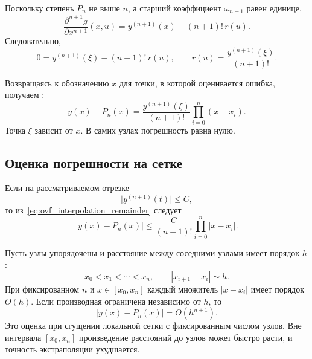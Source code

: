 \documentclass[../final.tex]{subfiles}
\begin{document}
Поскольку степень $P_n$ не выше $n$, а старший коэффициент
$\omega_{n+1}$ равен единице,
%
\begin{equation*}
    \frac{\partial^{n+1}g}{\partial x^{n+1}}(x,u)
    =y^{(n+1)}(x)-(n+1)!\,r(u).
\end{equation*}
%
Следовательно,
%
\begin{equation*}
    0=y^{(n+1)}(\xi)-(n+1)!\,r(u),
    \qquad
    r(u)=\frac{y^{(n+1)}(\xi)}{(n+1)!}.
\end{equation*}

Возвращаясь к обозначению $x$ для точки, в которой оценивается ошибка,
получаем :
%
\begin{equation}
    y(x)-P_n(x)=\frac{y^{(n+1)}(\xi)}{(n+1)!}
    \prod_{i=0}^{n}(x-x_i).
    \label{eq:ovf_interpolation_remainder}
\end{equation}
%
Точка $\xi$ зависит от $x$. В самих узлах погрешность равна нулю.

\subsection{Оценка погрешности на сетке}

Если на рассматриваемом отрезке
%
\begin{equation*}
    \bigl|y^{(n+1)}(t)\bigr|\le C,
\end{equation*}
%
то из~\eqref{eq:ovf_interpolation_remainder} следует
%
\begin{equation*}
    |y(x)-P_n(x)|\le\frac{C}{(n+1)!}
    \prod_{i=0}^{n}|x-x_i|.
\end{equation*}

Пусть узлы упорядочены и расстояние между соседними узлами имеет
порядок $h$:
%
\begin{equation*}
    x_0<x_1<\cdots<x_n,
    \qquad |x_{i+1}-x_i|\sim h.
\end{equation*}
%
При фиксированном $n$ и $x\in[x_0,x_n]$ каждый множитель $|x-x_i|$
имеет порядок $O(h)$. Если производная ограничена независимо от $h$, то
%
\begin{equation*}
    |y(x)-P_n(x)|=O(h^{n+1}).
\end{equation*}
%
Это оценка при сгущении локальной сетки с фиксированным числом узлов.
Вне интервала $[x_0,x_n]$ произведение расстояний до узлов может быстро
расти, и точность экстраполяции ухудшается.
\end{document}
